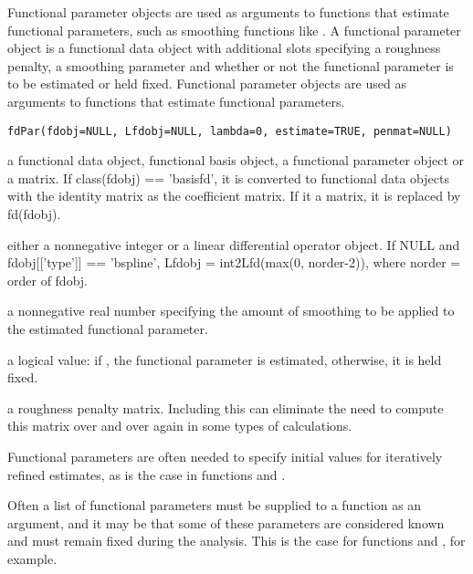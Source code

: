 \documentclass{article}
\begin{document}
\begin{Description}\relax
Functional parameter objects are used as arguments to functions that
estimate functional parameters, such as smoothing functions like
.  A functional parameter object is a functional
data object with additional slots specifying a roughness penalty, a
smoothing parameter and whether or not the functional parameter is to
be estimated or held fixed.  Functional parameter objects are used as
arguments to functions that estimate functional parameters.
\end{Description}
\begin{Usage}
\begin{verbatim}
fdPar(fdobj=NULL, Lfdobj=NULL, lambda=0, estimate=TRUE, penmat=NULL)
\end{verbatim}
\end{Usage}
\begin{Arguments}
\begin{ldescription}
\item[\code{fdobj}] a functional data object, functional basis object, a functional
parameter object or a matrix.  If class(fdobj) == 'basisfd', it is
converted to functional data objects with the identity matrix as the
coefficient matrix.  If it a matrix, it is replaced by fd(fdobj).      

\item[\code{Lfdobj}] either a nonnegative integer or a linear differential operator
object.  If NULL and fdobj[['type']] == 'bspline', Lfdobj =
int2Lfd(max(0, norder-2)), where norder = order of fdobj.   

\item[\code{lambda}] a nonnegative real number specifying the amount of smoothing
to be applied to the estimated functional parameter.

\item[\code{estimate}] a logical value:  if , the functional parameter is
estimated, otherwise, it is held fixed.

\item[\code{penmat}] a roughness penalty matrix.  Including this can eliminate the need
to compute this matrix over and over again in some types of
calculations.

\end{ldescription}
\end{Arguments}
\begin{Details}\relax
Functional parameters are often needed to specify initial
values for iteratively refined estimates, as is the case in
functions  and .

Often a list of functional parameters must be supplied to a function
as an argument, and it may be that some of these parameters are
considered known and must remain fixed during the analysis.  This is
the case for functions  and  , for
example.
\end{Details}
\end{document}
